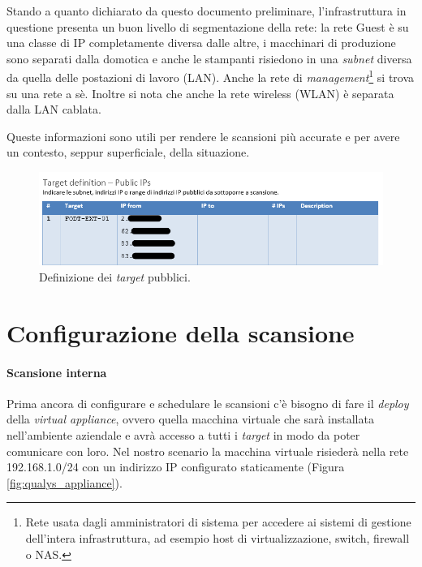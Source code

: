 \documentclass[target=bach,aauheader=]{thud}
\begin{document}
Stando a quanto dichiarato da questo documento preliminare, l'infrastruttura in questione presenta un buon livello di segmentazione della rete: la rete Guest è su una classe di IP completamente diversa dalle altre, i macchinari di produzione sono separati dalla domotica e anche le stampanti risiedono in una \textit{subnet} diversa da quella delle postazioni di lavoro (LAN). Anche la rete di \textit{management}\footnote{Rete usata dagli amministratori di sistema per accedere ai sistemi di gestione dell'intera infrastruttura, ad esempio host di virtualizzazione, switch, firewall o NAS.} si trova su una rete a sè. Inoltre si nota che anche la rete wireless (WLAN) è separata dalla LAN cablata.

Queste informazioni sono utili per rendere le scansioni più accurate e per avere un contesto, seppur superficiale, della situazione.

\begin{figure}[h]
\centering
\includegraphics[scale=0.8]{images/target_definition_ext.png}
    \caption{Definizione dei \textit{target} pubblici.}
    \label{fig:target_definition_ext}
\end{figure}

\section{Configurazione della scansione}
\paragraph{Scansione interna} Prima ancora di configurare e schedulare le scansioni c'è bisogno di fare il \textit{deploy} della \textit{virtual appliance}, ovvero quella macchina virtuale che sarà installata nell'ambiente aziendale e avrà accesso a tutti i \textit{target} in modo da poter comunicare con loro. Nel nostro scenario la macchina virtuale risiederà nella rete 192.168.1.0/24 con un indirizzo IP configurato staticamente (Figura \ref{fig:qualys_appliance}).
\end{document}
